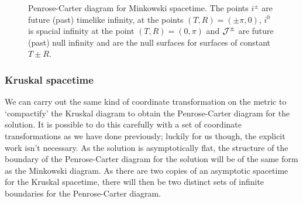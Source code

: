 \begin{figure}[!h]
\centering
{}
\caption[Penrose-Carter diagram for Minkowski spacetime.]{Penrose-Carter diagram for Minkowski spacetime. The points $i^\pm$ are future (past) timelike infinity, at the points $(T,R) = (\pm \pi, 0)$, $i^0$ is spacial infinity at the point $(T,R) = (0,\pi)$ and ${\cal J}^{\pm}$ are future (past) null infinity and are the null surfaces for surfaces of constant $T \pm R$.}
\label{fig:minkpenrose}
\end{figure}


\subsubsection{Kruskal spacetime}

We can carry out the same kind of coordinate transformation on the metric  to `compactify' the Kruskal diagram to obtain the Penrose-Carter diagram for the \sch solution. It is possible to do this carefully with a set of coordinate transformations as we have done previously; luckily for us though, the explicit work isn't necessary. As the \sch solution is asymptotically flat, the structure of the boundary of the Penrose-Carter diagram for the \sch solution will be of the same form as the Minkowski diagram. As there are two copies of an asymptotic spacetime for the Kruskal spacetime, there will then be two distinct sets of infinite boundaries for the Penrose-Carter diagram.


